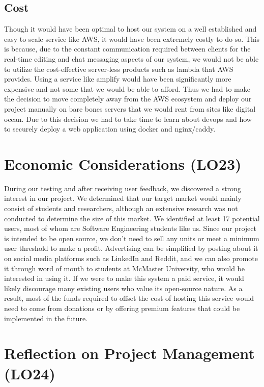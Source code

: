 \documentclass{article}
\begin{document}
	\subsection{Cost}
	
	Though it would have been optimal to host our system on a well established and easy to scale service like AWS, it would have been extremely costly to do so. This is because, due to the constant communication required between clients for the real-time editing and chat messaging aspects of our system, we would not be able to utilize the cost-effective server-less products such as lambda that AWS provides. Using a service like amplify would have been significantly more expensive and not some that we would be able to afford. Thus we had to make the decision to move completely away from the AWS ecosystem and deploy our project manually on bare bones servers that we would rent from sites like digital ocean. Due to this decision we had to take time to learn about devops and how to securely deploy a web application using docker and nginx/caddy.
	
	\section{Economic Considerations (LO23)}
	
	During our testing and after receiving user feedback, we discovered a strong interest in our project. We determined that our target market would mainly consist of students and researchers, although an extensive research was not conducted to determine the size of this market. We identified at least 17 potential users, most of whom are Software Engineering students like us. Since our project is intended to be open source, we don't need to sell any units or meet a minimum user threshold to make a profit. Advertising can be simplified by posting about it on social media platforms such as LinkedIn and Reddit, and we can also promote it through word of mouth to students at McMaster University, who would be interested in using it. If we were to make this system a paid service, it would likely discourage many existing users who value its open-source nature. As a result, most of the funds required to offset the cost of hosting this service would need to come from donations or by offering premium features that could be implemented in the future.
	
	\section{Reflection on Project Management (LO24)}
	
\end{document}
